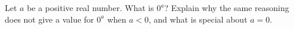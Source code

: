 Let $a$ be a positive real number. What is $0^a$? Explain why the same reasoning does not give a value for $0^a$ when $a<0$, and what is special about $a=0$.
